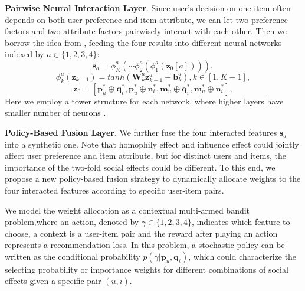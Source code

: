 \documentclass[sigconf]{acmart}
\begin{document}
\textbf{Pairwise Neural Interaction Layer}. Since user's decision on one item often depends on both user preference and item attribute, we can let two preference factors and two attribute factors pairwisely interact with each other. Then we borrow the idea from \cite{NCF}, feeding the four results into different neural networks indexed by $a\in \{1,2,3,4\}$:
\begin{equation}\nonumber
\mathbf s_a = \phi_K^a(\cdots\phi_2^a(\phi_1^a(\mathbf z_0[a]))),
\end{equation}
\begin{equation}\nonumber
\phi_k^a(\mathbf z_{k-1}) = tanh(\mathbf W_k^a \mathbf z_{k-1}^a+\mathbf b_k^a), k\in[1, K-1],
\end{equation}
\begin{equation}\nonumber
\mathbf z_0 = [\mathbf p^*_u \oplus \mathbf q^*_i, \mathbf p^*_u \oplus \mathbf n^*_i, \mathbf m^*_u \oplus \mathbf q^*_i, \mathbf m^*_u \oplus \mathbf n^*_i],
\end{equation}
Here we employ
a tower structure for each network, where higher layers have
smaller number of neurons \cite{NCF}. 

\textbf{Policy-Based Fusion Layer}. 
We further fuse the four interacted features $\mathbf s_a$ into a synthetic one. Note that homophily effect and influence effect could jointly affect user preference and item attribute, but for distinct users and items, the importance of the two-fold social effects could be different. 
To this end, we propose a new policy-based fusion strategy to dynamically allocate  weights to the four interacted features according to specific user-item pairs.

We model the weight allocation as a contextual multi-armed bandit problem\cite{Multi-armed},where an action, denoted by $\gamma\in\{1, 2, 3, 4\}$, indicates which feature to choose, a context is a user-item pair and the reward after playing an action represents a recommendation loss. In this problem, a stochastic policy can be written as the conditional probability $p(\gamma|\mathbf p_u, \mathbf q_i)$, which could characterize the selecting probability or importance weights for different combinations of social effects given a specific pair $(u,i)$.
\end{document}
